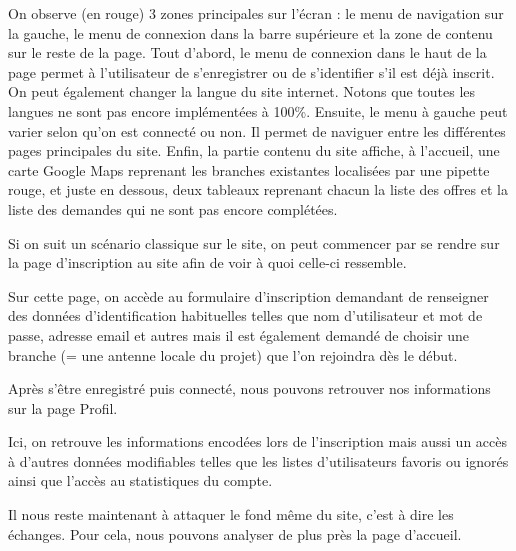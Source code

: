 On observe (en rouge) 3 zones principales sur l'écran : le menu de navigation sur la gauche,  le menu de connexion dans la barre supérieure et la zone de contenu sur le reste de la page.  
Tout d'abord,  le menu de connexion dans le haut de la page permet à l'utilisateur de s'enregistrer ou de s'identifier s'il est déjà inscrit.  On peut également changer la langue du site internet.  Notons que toutes les langues ne sont pas encore implémentées à 100\%.  
Ensuite,  le menu à gauche peut varier selon qu'on est connecté ou non.  Il permet de naviguer entre les différentes pages principales du site.  
Enfin,  la partie contenu du site affiche,  à l'accueil,  une carte Google Maps reprenant les branches existantes localisées par une pipette rouge,  et juste en dessous,  deux tableaux reprenant chacun la liste des offres et la liste des demandes qui ne sont pas encore complétées.  

Si on suit un scénario classique sur le site,  on peut commencer par se rendre sur la page d'inscription au site afin de voir à quoi celle-ci ressemble.

\vspace{1cm}
\vspace{1cm}

Sur cette page,  on accède au formulaire d'inscription demandant de renseigner des données d'identification habituelles telles que nom d'utilisateur et mot de passe,  adresse email et autres mais il est également demandé de choisir une branche (= une antenne locale du projet) que l'on rejoindra dès le début.  

Après s'être enregistré puis connecté,  nous pouvons retrouver nos informations sur la page Profil.

\vspace{1cm}
\vspace{1cm}

Ici,  on retrouve les informations encodées lors de l'inscription mais aussi un accès à d'autres données modifiables telles que les listes d'utilisateurs favoris ou ignorés ainsi que l'accès au statistiques du compte.

Il nous reste maintenant à attaquer le fond même du site,  c'est à dire les échanges.  Pour cela,  nous pouvons analyser de plus près la page d'accueil.  

\vspace{1cm}
\vspace{1cm}

